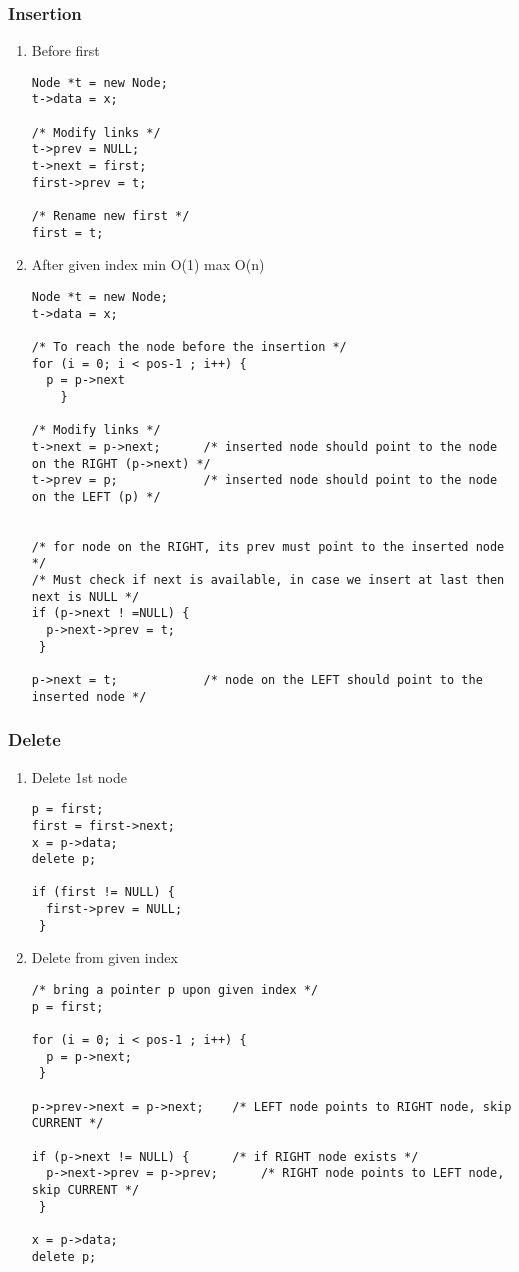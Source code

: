 \documentclass[11pt]{article}
\begin{document}
\subsubsection{Insertion}
\label{sec:org4794d8f}
\begin{enumerate}
\item Before first
\label{sec:orgcf2327e}
\begin{verbatim}
Node *t = new Node;
t->data = x;

/* Modify links */
t->prev = NULL;
t->next = first;
first->prev = t;

/* Rename new first */
first = t;
\end{verbatim}
\item After given index min O(1) max O(n)
\label{sec:org6fd7cdc}
\begin{verbatim}
Node *t = new Node;
t->data = x;

/* To reach the node before the insertion */
for (i = 0; i < pos-1 ; i++) {
  p = p->next
    }

/* Modify links */
t->next = p->next;		/* inserted node should point to the node on the RIGHT (p->next) */
t->prev = p;			/* inserted node should point to the node on the LEFT (p) */


/* for node on the RIGHT, its prev must point to the inserted node */
/* Must check if next is available, in case we insert at last then next is NULL */
if (p->next ! =NULL) {
  p->next->prev = t;
 }

p->next = t; 			/* node on the LEFT should point to the inserted node */

\end{verbatim}
\end{enumerate}
\subsubsection{Delete}
\label{sec:orgd4c97a1}
\begin{enumerate}
\item Delete 1st node
\label{sec:org6b46761}
\begin{verbatim}
p = first;
first = first->next;
x = p->data;
delete p;

if (first != NULL) {
  first->prev = NULL;
 }
\end{verbatim}
\item Delete from given index
\label{sec:orgc0d7f7a}
\begin{verbatim}
/* bring a pointer p upon given index */
p = first;

for (i = 0; i < pos-1 ; i++) {
  p = p->next;
 }

p->prev->next = p->next; 	/* LEFT node points to RIGHT node, skip CURRENT */

if (p->next != NULL) {		/* if RIGHT node exists */
  p->next->prev = p->prev;  	/* RIGHT node points to LEFT node, skip CURRENT */
 }

x = p->data;
delete p;
\end{verbatim}
\end{enumerate}
\end{document}
